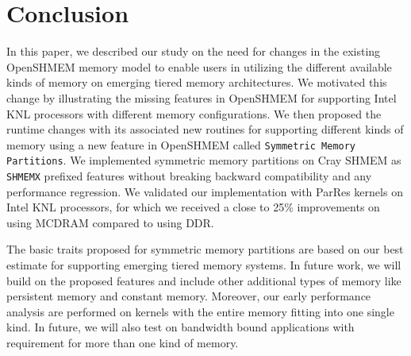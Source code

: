 \section{Conclusion}
\label{src:conclusion}
In this paper, we described our study on the need for
changes in
the existing OpenSHMEM memory model to enable users in
utilizing
the different available kinds of memory on emerging tiered
memory architectures. We motivated this change
by illustrating the missing features in OpenSHMEM for
supporting Intel KNL processors with different memory
configurations.
We then proposed the runtime
changes with its associated new routines %
for
supporting different kinds of memory using a new feature in
OpenSHMEM called \texttt{Symmetric Memory Partitions}.
We implemented
symmetric memory partitions on Cray SHMEM as
\texttt{SHMEMX} prefixed features without breaking
backward compatibility and any performance regression.
We validated our implementation with ParRes kernels on Intel
KNL processors, for which we received a close to 25\%
improvements on using MCDRAM compared to using DDR.

The basic traits proposed for symmetric memory partitions
are based on our best estimate for supporting emerging tiered
memory systems. In future work, we will build on the proposed
features and include other additional types of memory like
persistent memory and constant memory. Moreover, our early
performance analysis are performed on kernels with the
entire memory fitting into one single kind. In future, we will
also test on bandwidth bound applications with requirement
for more than one kind of memory.
